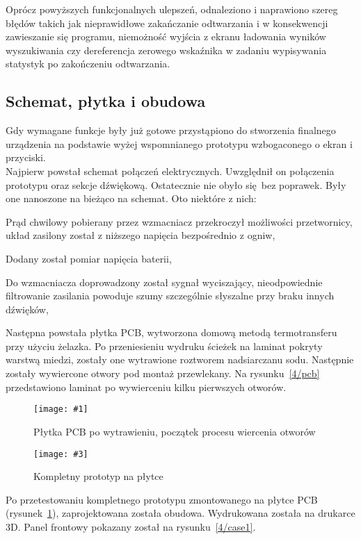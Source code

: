 \documentclass[polish]{aghengthesis}
\let\tempone\itemize
\let\temptwo\enditemize
\renewenvironment{itemize}{\tempone\setlength{\itemsep}{0cm}}{\temptwo}
\newcommand{\imgintss}[5]{
	\begin{figure}[{#5}]
		\centering
		\begin{minipage}{.45\textwidth}
			\centering
			\texttt{[image: \#1]}
			\caption{#2}
			\label{#1}
		\end{minipage}%
		\hfill
		\begin{minipage}{.45\textwidth}
			\centering
			\texttt{[image: \#3]}
			\caption{#4}
			\label{#3}
		\end{minipage}
	\end{figure}
}
\newcommand{\imghss}[4]{\imgintss{#1}{#2}{#3}{#4}{H}}
\begin{document}
			Oprócz powyższych funkcjonalnych ulepszeń, odnaleziono i naprawiono szereg błędów takich jak nieprawidłowe zakańczanie odtwarzania i w konsekwencji zawieszanie się programu, niemożność wyjścia z ekranu ładowania wyników wyszukiwania czy dereferencja zerowego wskaźnika w zadaniu wypisywania statystyk po zakończeniu odtwarzania.
			
		\subsection{Schemat, płytka i obudowa}
			Gdy wymagane funkcje były już gotowe przystąpiono do stworzenia finalnego urządzenia na podstawie wyżej wspomnianego prototypu wzbogaconego o ekran i przyciski.
			$ $\\
			
			Najpierw powstał schemat połączeń elektrycznych. Uwzględnił on połączenia prototypu oraz sekcje dźwiękową. Ostatecznie nie obyło się bez poprawek. Były one nanoszone na bieżąco na schemat. Oto niektóre z nich:
			\begin{itemize}
				\item Prąd chwilowy pobierany przez wzmacniacz przekroczył możliwości przetwornicy, układ zasilony został z niższego napięcia bezpośrednio z ogniw,
				\item Dodany został pomiar napięcia baterii,
				\item Do wzmacniacza doprowadzony został sygnał wyciszający, nieodpowiednie filtrowanie zasilania powoduje szumy szczególnie słyszalne przy braku innych dźwięków,
			\end{itemize}
			
			Następna powstała płytka PCB, wytworzona domową metodą termotransferu przy użyciu żelazka\textsuperscript{\cite{ch4_pcb_method}}. Po przeniesieniu wydruku ścieżek na laminat pokryty warstwą miedzi, zostały one wytrawione roztworem nadsiarczanu sodu. Następnie zostały wywiercone otwory pod montaż przewlekany. Na rysunku~\ref{4/pcb} przedstawiono laminat po wywierceniu kilku pierwszych otworów.
			
			\imghss{4/pcb}{Płytka PCB po wytrawieniu, początek procesu wiercenia otworów}{4/prototype_3}{Kompletny prototyp na płytce}
			
			Po przetestowaniu kompletnego prototypu zmontowanego na płytce PCB (rysunek~\ref{4/prototype_3}), zaprojektowana została obudowa. Wydrukowana została na drukarce 3D. Panel frontowy pokazany został na rysunku~\ref{4/case1}.
			$ $\\
			
\end{document}
